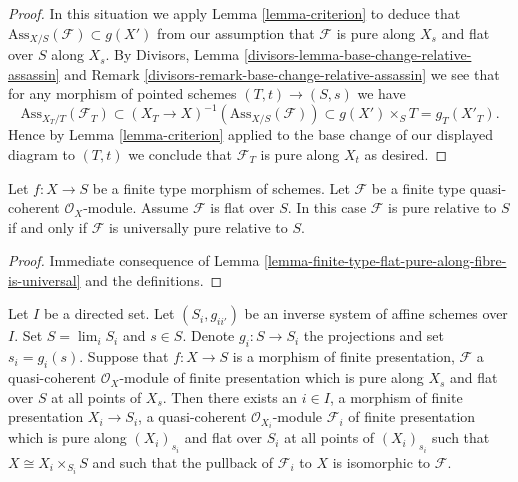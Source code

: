 \begin{proof}
\medskip\noindent
In this situation we apply
Lemma \ref{lemma-criterion}
to deduce that $\text{Ass}_{X/S}(\mathcal{F}) \subset g(X')$
from our assumption that $\mathcal{F}$ is pure along $X_s$
and flat over $S$ along $X_s$. By
Divisors, Lemma \ref{divisors-lemma-base-change-relative-assassin} and
Remark \ref{divisors-remark-base-change-relative-assassin}
we see that for any morphism of pointed schemes
$(T, t) \to (S, s)$ we have
$$
\text{Ass}_{X_T/T}(\mathcal{F}_T) \subset
(X_T \to X)^{-1}(\text{Ass}_{X/S}(\mathcal{F})) \subset
g(X') \times_S T = g_T(X'_T).
$$
Hence by
Lemma \ref{lemma-criterion}
applied to the base change of our displayed diagram to $(T, t)$
we conclude that $\mathcal{F}_T$ is pure along $X_t$ as desired.
\end{proof}

\begin{lemma}
\label{lemma-finite-type-flat-pure-is-universal}
Let $f : X \to S$ be a finite type morphism of schemes.
Let $\mathcal{F}$ be a finite type quasi-coherent $\mathcal{O}_X$-module.
Assume $\mathcal{F}$ is flat over $S$. In this case
$\mathcal{F}$ is pure relative to $S$ if and only if $\mathcal{F}$
is universally pure relative to $S$.
\end{lemma}

\begin{proof}
Immediate consequence of
Lemma \ref{lemma-finite-type-flat-pure-along-fibre-is-universal}
and the definitions.
\end{proof}

\begin{lemma}
\label{lemma-limit-purity}
Let $I$ be a directed set.
Let $(S_i, g_{ii'})$ be an inverse system of affine schemes over $I$.
Set $S = \lim_i S_i$ and $s \in S$.
Denote $g_i : S \to S_i$ the projections and set $s_i = g_i(s)$.
Suppose that $f : X \to S$ is a morphism of finite presentation,
$\mathcal{F}$ a quasi-coherent $\mathcal{O}_X$-module of finite presentation
which is pure along $X_s$ and flat over $S$ at all points of $X_s$.
Then there exists an $i \in I$, a morphism of finite presentation
$X_i \to S_i$, a quasi-coherent $\mathcal{O}_{X_i}$-module $\mathcal{F}_i$
of finite presentation which is pure along $(X_i)_{s_i}$ and flat over $S_i$
at all points of $(X_i)_{s_i}$ such that $X \cong X_i \times_{S_i} S$
and such that the pullback of $\mathcal{F}_i$ to $X$ is isomorphic
to $\mathcal{F}$.
\end{lemma}

